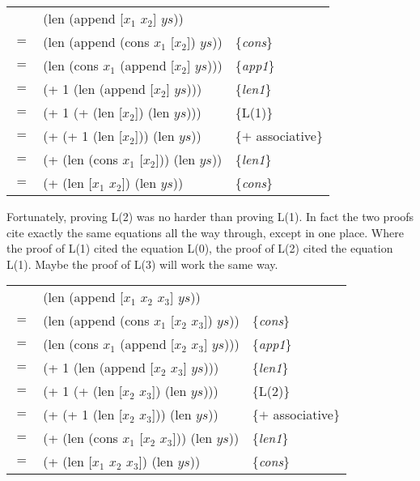 \begin{center}
\begin{tabular}{lll}
    & (len (append [$x_1$ $x_2$] $ys$))         &                     \\
$=$ & (len (append (cons $x_1$ [$x_2$]) $ys$))  & \{\emph{cons}\}     \\
$=$ & (len (cons $x_1$ (append [$x_2$] $ys$)))  & \{\emph{app1}\}     \\
$=$ & (+ 1 (len (append [$x_2$] $ys$)))         & \{\emph{len1}\}     \\
$=$ & (+ 1 (+ (len [$x_2$]) (len $ys$)))        & \{L(1)\}            \\
$=$ & (+ (+ 1 (len [$x_2$])) (len $ys$))        & \{$+$ associative\} \\
$=$ & (+ (len (cons $x_1$ [$x_2$])) (len $ys$)) & \{\emph{len1}\}     \\
$=$ & (+ (len [$x_1$ $x_2$]) (len $ys$))        & \{\emph{cons}\}     \\
\end{tabular}
\end{center}

Fortunately, proving L(2) was no harder than proving L(1).
In fact the two proofs cite exactly the same equations all the way through,
except in one place.
Where the proof of L(1) cited the equation L(0),
the proof of L(2) cited the equation L(1).
Maybe the proof of L(3) will work the same way.

\begin{center}
\begin{tabular}{lll}
    & (len (append [$x_1$ $x_2$ $x_3$] $ys$))         &                     \\
$=$ & (len (append (cons $x_1$ [$x_2$ $x_3$]) $ys$))  & \{\emph{cons}\}     \\
$=$ & (len (cons $x_1$ (append [$x_2$ $x_3$] $ys$)))  & \{\emph{app1}\}     \\
$=$ & (+ 1 (len (append [$x_2$ $x_3$] $ys$)))         & \{\emph{len1}\}     \\
$=$ & (+ 1 (+ (len [$x_2$ $x_3$]) (len $ys$)))        & \{L(2)\}            \\
$=$ & (+ (+ 1 (len [$x_2$ $x_3$])) (len $ys$))        & \{$+$ associative\} \\
$=$ & (+ (len (cons $x_1$ [$x_2$ $x_3$])) (len $ys$)) & \{\emph{len1}\}     \\
$=$ & (+ (len [$x_1$ $x_2$ $x_3$]) (len $ys$))        & \{\emph{cons}\}     \\
\end{tabular}
\end{center}

